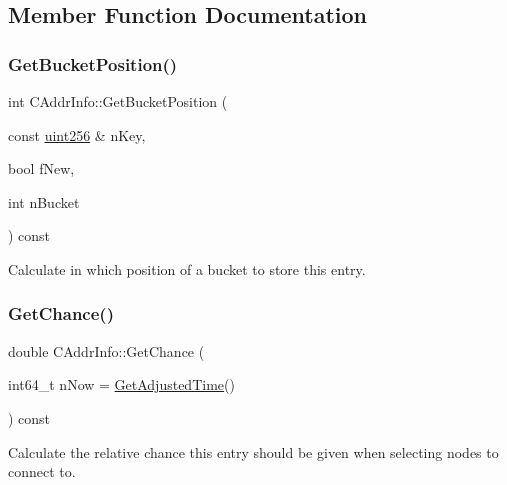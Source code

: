\subsection{Member Function Documentation}
\mbox{\label{class_c_addr_info_a3a133ffb3fbf67cbeb5f4bc683fa9126}} 
\subsubsection{\texorpdfstring{Get\+Bucket\+Position()}{GetBucketPosition()}}
{\footnotesize\ttfamily int C\+Addr\+Info\+::\+Get\+Bucket\+Position (\begin{DoxyParamCaption}\item[{const \mbox{\hyperlink{classuint256}{uint256}} \&}]{n\+Key,  }\item[{bool}]{f\+New,  }\item[{int}]{n\+Bucket }\end{DoxyParamCaption}) const}



Calculate in which position of a bucket to store this entry. 

\mbox{\label{class_c_addr_info_af6788fe5a5364e63896ab9dedb8e5d40}} 
\subsubsection{\texorpdfstring{Get\+Chance()}{GetChance()}}
{\footnotesize\ttfamily double C\+Addr\+Info\+::\+Get\+Chance (\begin{DoxyParamCaption}\item[{int64\+\_\+t}]{n\+Now = {\ttfamily \mbox{\hyperlink{timedata_8h_a09f81b9c7650f898cf3cf305b87547e6}{Get\+Adjusted\+Time}}()} }\end{DoxyParamCaption}) const}



Calculate the relative chance this entry should be given when selecting nodes to connect to. 

\mbox{\label{class_c_addr_info_ae4459cd7719834bbcf77874757c6875e}} 

